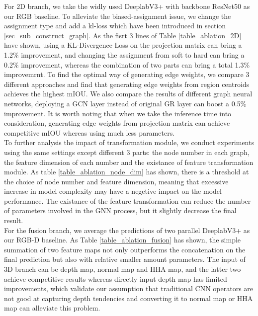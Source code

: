 \documentclass[journal]{IEEEtran}
\begin{document}
    For 2D branch, we take the widly used DeeplabV3+ with backbone ResNet50 as our RGB baseline. To alleviate the biased-assignment issue, we change the assignment type and add a kl-loss which have been introduced in section \ref{sec_sub_construct_graph}. As the fisrt 3 lines of Table \ref{table_ablation_2D} have shown, using a KL-Divergence Loss on the projection matrix can bring a 1.2\% improvement, and changing the assignment from soft to hard can bring a 0.2\% improvement, whereas the combination of two parts can bring a total 1.3\% improvemrnt. To find the optimal way of generating edge weights, we compare 3 different approaches and find that generating edge weights from region centroids achieves the highest mIOU. We also compare the results of different graph neural networks, deploying a GCN layer instead of original GR layer can boost a 0.5\% improvement. It is worth noting that when we take the inference time into consideration, generating edge weights from projection matrix can achieve competitive mIOU whereas using much less parameters. \\

    To further analysis the impact of transformation module, we conduct experiments using the same settings except different 3 parts: the node number in each graph, the feature dimension of each number and the existance of feature transformation module. As table \ref{table_ablation_node_dim} has shown, there is a threshold at the choice of node number and feature dimension, meaning that excessive increase in model complexity may have a negetive impact on the model performance. The existance of the feature transformation can reduce the number of parameters involved in the GNN process, but it slightly decrease the final result. \\


    For the fusion branch, we average the predictions of two parallel DeeplabV3+ as our RGB-D baseline. As Table \ref{table_ablation_fusion} has shown, the simple summation of two feature maps not only outperforms the concatenation on the final prediction but also with relative smaller amount parameters. The input of 3D branch can be depth map, normal map and HHA map, and the latter two achieve competitive results whereas directly input depth map has limited improvements, which validate our assumption that traditional CNN operators are not good at capturing depth tendencies and converting it to normal map or HHA map can alleviate this problem.
\end{document}
